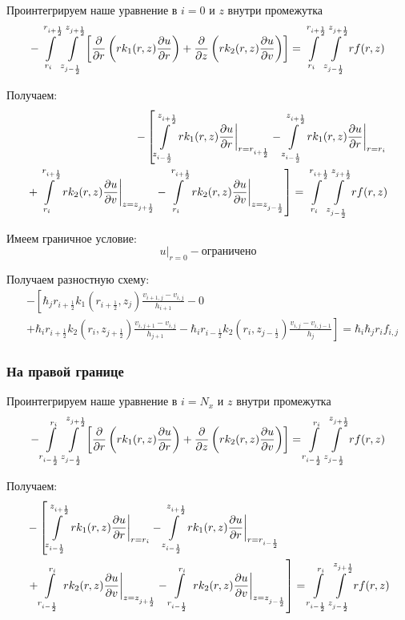 Проинтегрируем наше уравнение в $ i = 0 $ и $ z $ внутри промежутка
\[
  - \int\limits^{r_{i +\frac{1}{2}}}_{r_{i }} \int\limits^{z_{j +\frac{1}{2}}}_{z_{j -\frac{1}{2}}} \left [ \pdv{}{r} \left ( r k_1(r, z) \pdv{u}{r} \right ) 
  + \pdv{}{z} \left ( rk_2(r, z)\pdv{u}{v} \right ) \right ] = \int\limits^{r_{i +\frac{1}{2}}}_{r_{i }} \int\limits^{z_{j +\frac{1}{2}}}_{z_{j -\frac{1}{2}}} rf(r, z)
\]

Получаем:
\begin{align*}
  - \left [
   \int\limits^{z_{i+\frac{1}{2}}}_{z_{i-\frac{1}{2}}}  \left . r k_1(r, z) \pdv{u}{r} \right \vert_{r = r_{i + \frac{1}{2}}}
  - \int\limits^{z_{i+\frac{1}{2}}}_{z_{i-\frac{1}{2}}} \left . r k_1(r, z) \pdv{u}{r} \right \vert_{r = r_{i}}
  \right . \\
  \left . + \int\limits^{r_{i+\frac{1}{2}}}_{r_{i}} \left . rk_2(r, z)\pdv{u}{v} \right \vert_{z = z_{j + \frac{1}{2}}}
  - \int\limits^{r_{i+\frac{1}{2}}}_{r_{i}} \left . rk_2(r, z)\pdv{u}{v} \right \vert_{z = z_{j - \frac{1}{2}}}
  \right ] = \int\limits^{r_{i +\frac{1}{2}}}_{r_{i }} \int\limits^{z_{j +\frac{1}{2}}}_{z_{j -\frac{1}{2}}} rf(r, z)
\end{align*}

Имеем граничное условие:
\[
  \left . u \right \vert_{r=0} - \text{ограничено}
\]

Получаем разностную схему:
\begin{align*}
  &- \left [ 
  \hbar_j r_{i+\frac{1}{2}} k_1(r_{i+\frac{1}{2}}, z_j) \frac{v_{i+1, j} - v_{i, j}}{h_{i + 1}}
  - 0
  \right . \\
  &\left .
  + \hbar_i r_{i+\frac{1}{2}} k_2(r_i, z_{j+\frac{1}{2}}) \frac{v_{i, j + 1} - v_{i, j}}{h_{j + 1}}
  - \hbar_i r_{i-\frac{1}{2}} k_2(r_i, z_{j-\frac{1}{2}}) \frac{v_{i, j} - v_{i, j - 1}}{h_j}
  \right ]  = \hbar_i \hbar_j r_i f_{i, j}
\end{align*}

\subsubsection{На правой границе}
Проинтегрируем наше уравнение в $ i = N_x $ и $ z $ внутри промежутка
\[
  - \int\limits^{r_{i }}_{r_{i -\frac{1}{2}}} \int\limits^{z_{j +\frac{1}{2}}}_{z_{j -\frac{1}{2}}} \left [ \pdv{}{r} \left ( r k_1(r, z) \pdv{u}{r} \right ) 
  + \pdv{}{z} \left ( rk_2(r, z)\pdv{u}{v} \right ) \right ] = \int\limits^{r_{i }}_{r_{i -\frac{1}{2}}} \int\limits^{z_{j +\frac{1}{2}}}_{z_{j -\frac{1}{2}}} rf(r, z)
\]

Получаем:
\begin{align*}
  &- \left [
   \int\limits^{z_{i+\frac{1}{2}}}_{z_{i-\frac{1}{2}}}  \left . r k_1(r, z) \pdv{u}{r} \right \vert_{r = r_{i}}
  - \int\limits^{z_{i+\frac{1}{2}}}_{z_{i-\frac{1}{2}}} \left . r k_1(r, z) \pdv{u}{r} \right \vert_{r = r_{i - \frac{1}{2}}}
  \right . \\
  &\left . + \int\limits^{r_{i}}_{r_{i-\frac{1}{2}}} \left . rk_2(r, z)\pdv{u}{v} \right \vert_{z = z_{j + \frac{1}{2}}}
  - \int\limits^{r_{i}}_{r_{i-\frac{1}{2}}} \left . rk_2(r, z)\pdv{u}{v} \right \vert_{z = z_{j - \frac{1}{2}}}
  \right ] = \int\limits^{r_{i }}_{r_{i -\frac{1}{2}}} \int\limits^{z_{j +\frac{1}{2}}}_{z_{j -\frac{1}{2}}} rf(r, z)
\end{align*}

